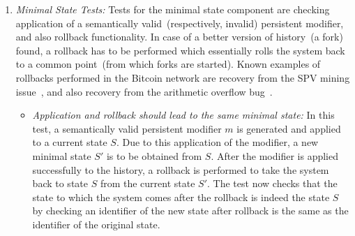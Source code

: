 \begin{enumerate}[\IEEEsetlabelwidth{Z}]
\item \textit{Minimal State Tests:} Tests for the minimal state component are checking application of a semantically valid~(respectively, invalid) persistent modifier, and also rollback functionality. In case of a better version of history~(a fork) found, a rollback has to be performed which essentially rolls the system back to a common point~(from which forks are started). Known examples of rollbacks performed in the Bitcoin network are recovery from the SPV mining issue~\cite{spvMining}, and also recovery from the arithmetic overflow bug~\cite{overflow}.

\begin{itemize}[]

\item \textit{Application and rollback should lead to the same minimal state:} In this test, a semantically valid persistent modifier $m$ is generated and applied to a current state $S$. Due to this application of the modifier, a new minimal state $S'$ is to be obtained from $S$. After the modifier is applied successfully to the history, a rollback is performed to take the system back to state $S$ from the current state $S'$. The test now checks that the state to which the system comes after the rollback is indeed the state $S$ by checking an identifier of the new state after rollback is the same as the identifier of the original state.\\


\end{itemize}
\end{enumerate}
